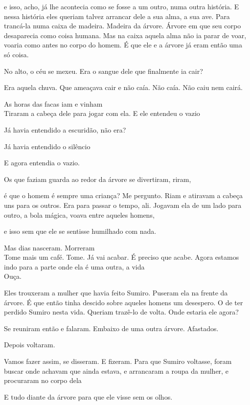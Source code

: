 e isso, acho, já lhe acontecia como se fosse a um outro, numa outra
história. E nessa história eles queriam talvez arrancar dele a sua alma,
a sua ave. Para trancá-la numa caixa de madeira. Madeira da árvore.
Árvore em que seu corpo desaparecia como coisa humana. Mas na caixa
aquela alma não ia parar de voar, voaria como antes no corpo do homem. É
que ele e a árvore já eram então uma só coisa.

No alto, o céu se mexeu. Era o sangue dele que finalmente ia cair?

Era aquela chuva. Que ameaçava cair e não caía. Não caía. Não caiu nem
cairá.

As horas das facas iam e vinham\\

Tiraram a cabeça dele para jogar com ela. E ele entendeu o vazio

Já havia entendido a escuridão, não era?

Já havia entendido o silêncio

E agora entendia o vazio.

Os que faziam guarda ao redor da árvore se divertiram, riram,

é que o homem é sempre uma criança? Me pergunto. Riam e atiravam a
cabeça uns para os outros. Era para passar o tempo, ali. Jogavam ela de
um lado para outro, a bola mágica, voava entre aqueles homens,

e isso sem que ele se sentisse humilhado com nada.

Mas dias nasceram. Morreram\\

Tome mais um café. Tome. Já vai acabar. É preciso que acabe. Agora
estamos indo para a parte onde ela é uma outra, a vida\\

Ouça.

Eles trouxeram a mulher que havia feito Sumiro. Puseram ela na frente da
árvore. É que então tinha descido sobre aqueles homens um desespero. O
de ter perdido Sumiro nesta vida. Queriam trazê-lo de volta. Onde
estaria ele agora?

Se reuniram então e falaram. Embaixo de uma outra árvore. Afastados.

Depois voltaram.

Vamos fazer assim, se disseram. E fizeram. Para que Sumiro voltasse,
foram buscar onde achavam que ainda estava, e arrancaram a roupa da
mulher, e procuraram no corpo dela

E tudo diante da árvore para que ele visse sem os olhos.

